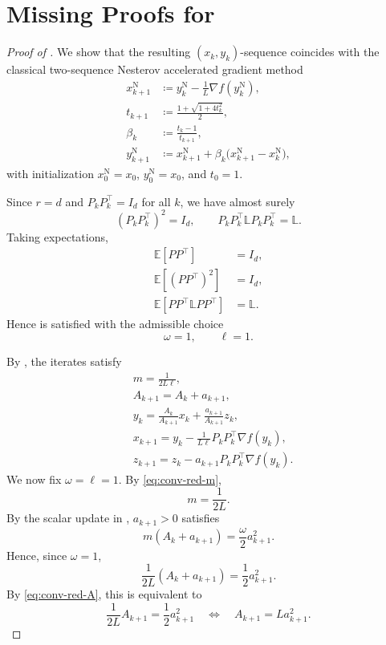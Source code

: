 \documentclass[10pt]{article}
\newcommand{\E}{\mathbb{E}}
\newcommand{\Lmat}{\mathbb{L}}
\begin{document}
\section{Missing Proofs for  }
\label{app:missing-proofs-convex}
\begin{proof}[Proof of ]


We show that the resulting \((x_k,y_k)\)-sequence coincides with the classical
two-sequence Nesterov accelerated gradient method
\begin{align}
x_{k+1}^{\mathrm N}
&\coloneqq y_k^{\mathrm N} - \frac{1}{L}\nabla f(y_k^{\mathrm N}),
\label{eq:NAG-conv-x-final}\\
t_{k+1} &\coloneqq \frac{1+\sqrt{1+4t_k^2}}{2},
\label{eq:NAG-conv-t-final}\\
\beta_k &\coloneqq \frac{t_k-1}{t_{k+1}},
\label{eq:NAG-conv-beta-final}\\
y_{k+1}^{\mathrm N}
&\coloneqq x_{k+1}^{\mathrm N} + \beta_k\bigl(x_{k+1}^{\mathrm N}-x_k^{\mathrm N}\bigr),
\label{eq:NAG-conv-y-final}
\end{align}
with initialization \(x_0^{\mathrm N}=x_0\), \(y_0^{\mathrm N}=x_0\),
and \(t_0=1\).

Since \(r=d\) and \(P_kP_k^\top=I_d\) for all \(k\), we have almost surely
\[
(P_kP_k^\top)^2 = I_d,
\qquad
P_kP_k^\top \Lmat P_kP_k^\top = \Lmat.
\]
Taking expectations,
\begin{align*}
\E[PP^\top] &= I_d,\\
\E[(PP^\top)^2] &= I_d,\\
\E[PP^\top \Lmat PP^\top] &= \Lmat.
\end{align*}
Hence  is satisfied with the
admissible choice
\[
\omega = 1,
\qquad
\ell = 1.
\]


By , the iterates satisfy
\begin{align}
&m = \frac{1}{2L\ell}, \label{eq:conv-red-m}\\
&A_{k+1} = A_k+a_{k+1}, \label{eq:conv-red-A}\\
&y_k = \frac{A_k}{A_{k+1}}x_k + \frac{a_{k+1}}{A_{k+1}}z_k, \label{eq:conv-red-y}\\
&x_{k+1} = y_k - \frac{1}{L\ell}P_kP_k^\top \nabla f(y_k), \label{eq:conv-red-x}\\
&z_{k+1} = z_k - a_{k+1}P_kP_k^\top \nabla f(y_k). \label{eq:conv-red-z}
\end{align}
We now fix \(\omega=\ell=1\). By \eqref{eq:conv-red-m},
\[
m=\frac{1}{2L}.
\]
By the scalar update in , \(a_{k+1}>0\) satisfies
\begin{equation}
m(A_k+a_{k+1})=\frac{\omega}{2}a_{k+1}^2.
\label{eq:conv-red-ak}
\end{equation}
Hence, since \(\omega=1\),
\[
\frac{1}{2L}(A_k+a_{k+1})=\frac{1}{2}a_{k+1}^2.
\]
By \eqref{eq:conv-red-A}, this is equivalent to
\[
\frac{1}{2L}A_{k+1}=\frac{1}{2}a_{k+1}^2
\quad\Longleftrightarrow\quad
A_{k+1}=La_{k+1}^2.
\]


\end{proof}
\end{document}
